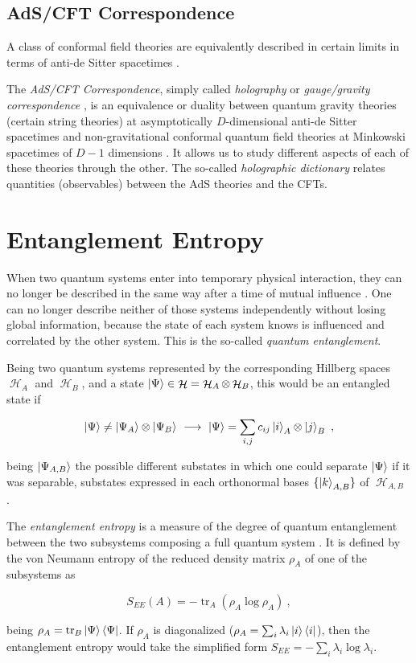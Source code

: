 \documentclass[twocolumn]{revtex4}
\providecommand{\eq}[2]{
    \begin{equation}
        #2
    \label{eq:#1}
    \end{equation}
}
\DeclareMathOperator{\calH}{\mathcal{H}}
\DeclareMathOperator{\tr}{tr}
\begin{document}
\subsection{AdS/CFT Correspondence} \label{ss:AdS/CFT}

A class of conformal field theories are equivalently described in certain limits in terms of anti-de Sitter spacetimes \cite{rangamani_holographic_2017}.

The \textit{AdS/CFT Correspondence}, simply called \textit{holography} or \textit{gauge/gravity correspondence} \cite{ramallo_introduction_2013}, is an equivalence or duality between quantum gravity theories (certain string theories) at asymptotically $D$-dimensional anti-de Sitter spacetimes and non-gravitational conformal quantum field theories at Minkowski spacetimes of $D-1$ dimensions \cite{maldacena_large_1999}. It allows us to study different aspects of each of these theories through the other. The so-called \textit{holographic dictionary} relates quantities (observables) between the AdS theories and the CFTs. %


\section{Entanglement Entropy} \label{s:EE}

When two quantum systems enter into temporary physical interaction, they can no longer be described in the same way after a time of mutual influence \cite{schrodinger_discussion_1935}. One can no longer describe neither of those systems independently without losing global information, because the state of each system knows is influenced and correlated by the other system. This is the so-called \textit{quantum entanglement}.

Being two quantum systems represented by the corresponding Hillberg spaces $\calH_A$ and $\calH_B$, and a state $\ket{\Psi} \in \calH = \calH_A \otimes \calH_B$, this would be an entangled state if
\eq{entanglement}{
    \ket{\Psi} \neq \ket{\Psi_A} \otimes \ket{\Psi_B} \ \longrightarrow \ \ket{\Psi} = \sum_{i,j} c_{ij} \ket{i}_A \otimes \ket{j}_B \ ,
}
being $\ket{\Psi_{A,B}}$ the possible different substates in which one could separate $\ket{\Psi}$ if it was separable, substates expressed in each orthonormal bases $\{ \ket{k}_{A,B} \}$ of $\calH_{A,B}$ \cite{}.

The \textit{entanglement entropy} is a measure of the degree of quantum entanglement between the two subsystems composing a full quantum system \cite{nishioka_entanglement_2018}. It is defined by the von
Neumann entropy of the reduced density matrix $\rho_A$ of one of the subsystems as
\eq{EE}{
    S_{EE}(A) = - \tr_A ( \rho_A \log \rho_A ) \ ,
}
being $\rho_A = \tr_B \ket{\Psi}\bra{\Psi}$. If $\rho_A$ is diagonalized ($\rho_A = \sum_i \lambda_i \ket{i}\bra{i}$), then the entanglement entropy would take the simplified form $S_{EE} = - \sum_i \lambda_i \log \lambda_i$.
\end{document}
